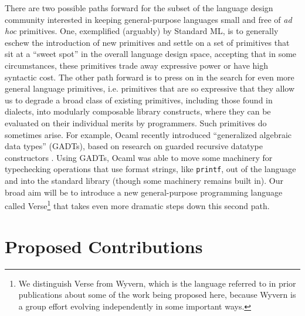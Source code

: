 \newpage
 There are two possible paths forward for the subset of the language design community interested in keeping general-purpose languages small and free of \emph{ad hoc} primitives. One, exemplified (arguably) by Standard ML, is to generally eschew the introduction of new primitives and settle on a set of primitives that sit at a ``sweet spot'' in the overall language design space, accepting that in some circumstances, these primitives trade away expressive power or have high syntactic cost. %
The other path forward is to press on in the search for even more general language primitives, i.e. primitives that are so expressive that they allow us to degrade a broad class of existing primitives, including those found in dialects, into modularly composable library constructs, where they can be evaluated on their individual merits by programmers. %
Such primitives do sometimes arise. For example, Ocaml recently introduced  ``generalized algebraic data types'' (GADTs), based on research on guarded recursive datatype constructors \cite{XiCheChe03}. Using GADTs, Ocaml was able to move some machinery for typechecking operations that use format strings, like \texttt{printf}, out of the language and into the standard library (though some machinery remains built in). Our broad aim will be to introduce a new general-purpose programming language called Verse\footnote{We distinguish Verse from Wyvern, which is the language referred to in prior publications about some of the work being proposed here, because Wyvern is a group effort evolving independently in some important ways.} that takes even more dramatic steps down this second path. %


\section{Proposed Contributions}




